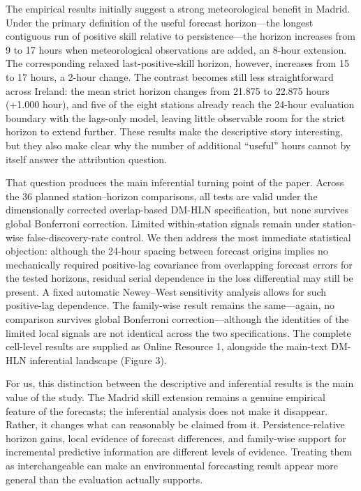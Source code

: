 \documentclass[9pt,a4paper]{article}
\begin{document}
The empirical results initially suggest a strong meteorological benefit in
Madrid. Under the primary definition of the useful forecast horizon---the
longest contiguous run of positive skill relative to persistence---the horizon
increases from 9 to 17 hours when meteorological observations are added, an
8-hour extension. The corresponding relaxed last-positive-skill horizon,
however, increases from 15 to 17 hours, a 2-hour change. The contrast becomes
still less straightforward across Ireland: the mean strict horizon changes
from 21.875 to 22.875 hours (+1.000 hour), and five of the eight stations
already reach the 24-hour evaluation boundary with the lags-only model, leaving
little observable room for the strict horizon to extend further. These results make
the descriptive story interesting, but they also make clear why the number of
additional ``useful'' hours cannot by itself answer the attribution question.

That question produces the main inferential turning point of the paper. Across
the 36 planned station--horizon comparisons, all tests are valid under the
dimensionally corrected overlap-based DM-HLN specification, but none survives
global Bonferroni correction. Limited within-station signals remain under
station-wise false-discovery-rate control. We then address the most immediate
statistical objection: although the 24-hour spacing between forecast origins
implies no mechanically required positive-lag covariance from overlapping
forecast errors for the tested horizons, residual serial dependence in the
loss differential may still be present. A fixed automatic Newey--West
sensitivity analysis allows for such positive-lag dependence. The family-wise
result remains the same---again, no comparison survives global Bonferroni
correction---although the identities of the limited local signals are not
identical across the two specifications. The complete cell-level results are
supplied as Online Resource 1, alongside the main-text DM-HLN inferential
landscape (Figure 3).

For us, this distinction between the descriptive and inferential results is
the main value of the study. The Madrid skill extension remains a genuine
empirical feature of the forecasts; the inferential analysis does not make it
disappear. Rather, it changes what can reasonably be claimed from it.
Persistence-relative horizon gains, local evidence of forecast differences,
and family-wise support for incremental predictive information are different
levels of evidence. Treating them as interchangeable can make an environmental
forecasting result appear more general than the evaluation actually supports.
\end{document}
